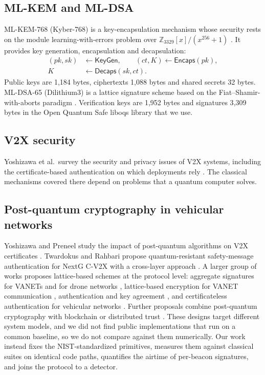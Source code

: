 \documentclass[journal,twoside]{IEEEtran}
\begin{document}
\subsection{ML-KEM and ML-DSA}

ML-KEM-768 (Kyber-768) is a key-encapsulation mechanism whose security rests on the module learning-with-errors problem over $\mathbb{Z}_{3329}[x]/(x^{256}+1)$ \cite{fips203}. It provides key generation, encapsulation and decapsulation:
\begin{align}
(pk,sk)&\leftarrow\mathsf{KeyGen},\qquad (ct,K)\leftarrow\mathsf{Encaps}(pk),\nonumber\\
K&\leftarrow\mathsf{Decaps}(sk,ct).
\label{eq:kem}
\end{align}
Public keys are 1{,}184 bytes, ciphertexts 1{,}088 bytes and shared secrets 32 bytes. ML-DSA-65 (Dilithium3) is a lattice signature scheme based on the Fiat--Shamir-with-aborts paradigm \cite{fips204}. Verification keys are 1{,}952 bytes and signatures 3{,}309 bytes in the Open Quantum Safe liboqs library that we use.

\subsection{V2X security}

Yoshizawa et al.\ survey the security and privacy issues of V2X systems, including the certificate-based authentication on which deployments rely \cite{yoshizawa2023}. The classical mechanisms covered there depend on problems that a quantum computer solves.

\subsection{Post-quantum cryptography in vehicular networks}

Yoshizawa and Preneel study the impact of post-quantum algorithms on V2X certificates \cite{yoshizawa2023vtc}. Twardokus and Rahbari propose quantum-resistant safety-message authentication for NextG C-V2X with a cross-layer approach \cite{twardokus2026}. A larger group of works proposes lattice-based schemes at the protocol level: aggregate signatures for VANETs \cite{prajapat2024} and for drone networks \cite{bagchi2023}, lattice-based encryption for VANET communication \cite{prajapat2026}, authentication and key agreement \cite{badhesha2026}, and certificateless authentication for vehicular networks \cite{ma2026,guo2026}. Further proposals combine post-quantum cryptography with blockchain or distributed trust \cite{aslam2025,sawant2026}. These designs target different system models, and we did not find public implementations that run on a common baseline, so we do not compare against them numerically. Our work instead fixes the NIST-standardized primitives, measures them against classical suites on identical code paths, quantifies the airtime of per-beacon signatures, and joins the protocol to a detector.
\end{document}
